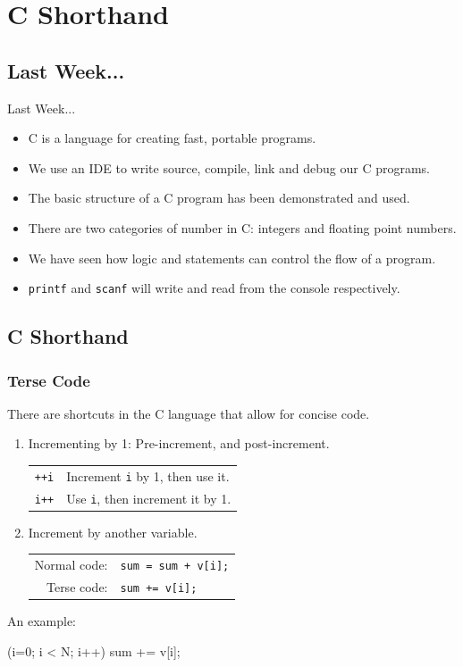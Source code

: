 \documentclass[smaller,table]{beamer}
\subtitle{Lecture 2 of 5}
\begin{document}
{
\begin{frame}
  \titlepage
\end{frame}
}

\section{C Shorthand}
\subsection{Last Week...}
\begin{frame}{Last Week...}
\begin{itemize}
\item C is a language for creating fast, portable programs.
\item We use an IDE to write source, compile, link and debug our C programs.
\item The basic structure of a C program has been demonstrated and used.
\item There are two categories of number in C: integers and floating point numbers.
\item We have seen how logic and statements can control the flow of a program.
\item \texttt{printf} and \texttt{scanf} will write and read from the console respectively.
\end{itemize}
\end{frame}


\subsection{C Shorthand}
\begin{frame}[fragile]
\frametitle{Terse Code}
There are shortcuts in the C language that allow for concise code.
\begin{enumerate}
\item Incrementing by 1: Pre-increment, and post-increment.\\
\begin{tabular}{l l}
\tt ++i& Increment {\tt i} by 1, then use it.\\
\tt i++& Use {\tt i}, then increment it by 1.
\end{tabular}
\item Increment by another variable.\\
\begin{tabular}{r l}
Normal code:&\tt sum = sum + v[i];\\
Terse code:&\tt sum += v[i];
\end{tabular}
\end{enumerate}
An example:\\
\begin{semiverbatim}
    (i=0; i < N; i++)
      sum += v[i];
\end{semiverbatim}
\end{frame}
\end{document}
